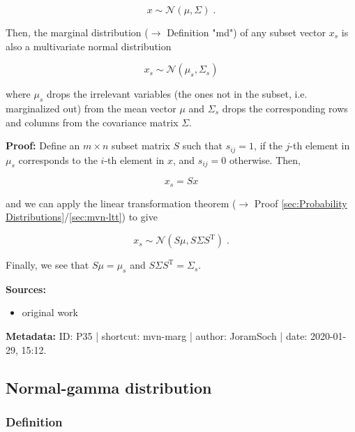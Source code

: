 \documentclass[a4paper,12pt]{book}
\begin{document}
\begin{equation} \label{eq:mvn-marg-mvn}
x \sim \mathcal{N}(\mu, \Sigma) \; .
\end{equation}

Then, the marginal distribution ($\rightarrow$ Definition "md") of any subset vector $x_s$ is also a multivariate normal distribution

\begin{equation} \label{eq:mvn-marg-mvn-marg}
x_s \sim \mathcal{N}(\mu_s, \Sigma_s)
\end{equation}

where $\mu_s$ drops the irrelevant variables (the ones not in the subset, i.e. marginalized out) from the mean vector $\mu$ and $\Sigma_s$ drops the corresponding rows and columns from the covariance matrix $\Sigma$.


\vspace{1em}
\textbf{Proof:} Define an $m \times n$ subset matrix $S$ such that $s_{ij} = 1$, if the $j$-th element in $\mu_s$ corresponds to the $i$-th element in $x$, and $s_{ij} = 0$ otherwise. Then,

\begin{equation} \label{eq:mvn-marg-xs}
x_s = S x
\end{equation}

and we can apply the linear transformation theorem ($\rightarrow$ Proof \ref{sec:Probability Distributions}/\ref{sec:mvn-ltt}) to give

\begin{equation} \label{eq:mvn-marg-mvn-marg-qed}
x_s \sim \mathcal{N}(S \mu, S \Sigma S^\mathrm{T}) \; .
\end{equation}

Finally, we see that $S \mu = \mu_s$ and $S \Sigma S^\mathrm{T} = \Sigma_s$.

\vspace{1em}
\textbf{Sources:}
\begin{itemize}
\item original work\end{itemize}


\vspace{1em}
\textbf{Metadata:} ID: P35 | shortcut: mvn-marg | author: JoramSoch | date: 2020-01-29, 15:12.


\subsection{Normal-gamma distribution}

\subsubsection[\textit{Definition}]{Definition} \label{sec:ng}
\end{document}
